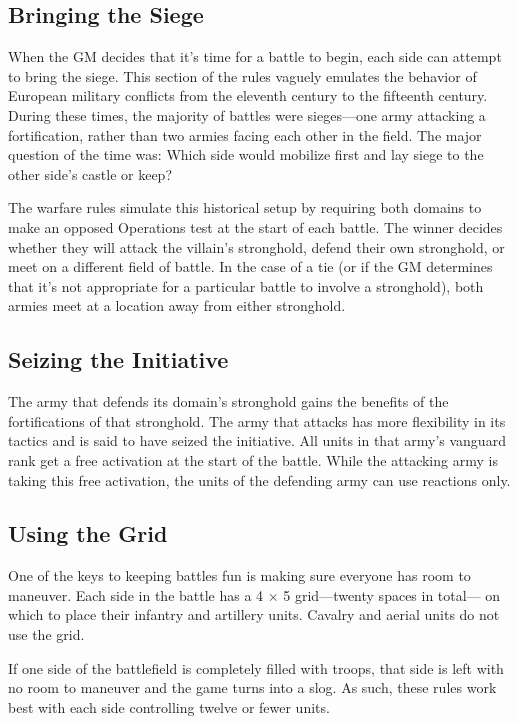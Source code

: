 \documentclass[10pt,a4paper,twoside,bg=print,twocolumn,openany,nodeprecatedcode]{dndbook}
\begin{document}
\subsection{Bringing the Siege}
When the GM decides that it's time for a battle to begin, each side can attempt to bring the siege. This section of the rules vaguely emulates the behavior of European military conflicts from the eleventh century to the fifteenth century. During these times, the majority of battles were sieges—one army attacking a fortification, rather than two armies facing each other in the field. The major question of the time was: Which side would mobilize first and lay siege to the other side's castle or keep?

The warfare rules simulate this historical setup by requiring both domains to make an opposed Operations test at the start of each battle. The winner decides whether they will attack the villain's stronghold, defend their own stronghold, or meet on a different field of battle. In the case of a tie (or if the GM determines that it's not appropriate for a particular battle to involve a stronghold), both armies meet at a location away from either stronghold.

\subsection{Seizing the Initiative}
The army that defends its domain's stronghold gains the benefits of the fortifications of that stronghold. The army that attacks has more flexibility in its tactics and is said to have seized the initiative. All units in that army's vanguard rank get a free activation at the start of the battle. While the attacking army is taking this free activation, the units of the defending army can use reactions only.

\subsection{Using the Grid}
One of the keys to keeping battles fun is making sure everyone has room to maneuver. Each side in the battle has a 4 × 5 grid—twenty spaces in total— on which to place their infantry and artillery units. Cavalry and aerial units do not use the grid.

If one side of the battlefield is completely filled with troops, that side is left with no room to maneuver and the game turns into a slog. As such, these rules work best with each side controlling twelve or fewer units.
\end{document}
